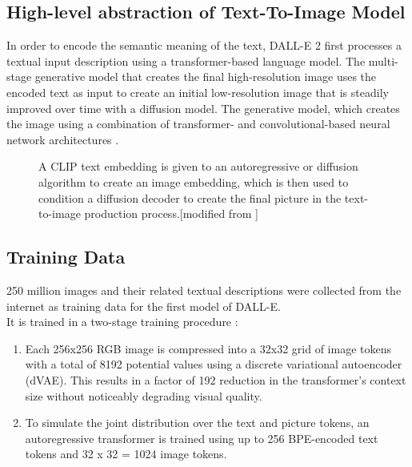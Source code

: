 \documentclass[9pt,twocolumn,twoside]{osajnl}
\begin{document}
\subsection{High-level abstraction of Text-To-Image Model}
In order to encode the semantic meaning of the text, DALL-E 2 first processes a textual input description using a transformer-based language model. The multi-stage generative model that creates the final high-resolution image uses the encoded text as input to create an initial low-resolution image that is steadily improved over time with a diffusion model. The generative model, which creates the image using a combination of transformer- and convolutional-based neural network architectures \cite{T2IReview}.

\begin{figure} [h]
	\centering
	\caption{A CLIP text embedding is given to an autoregressive or diffusion algorithm to create an image embedding, which is then used to condition a diffusion decoder to create the final picture in the text-to-image production process.[modified from \cite{CLIP}]}
\end{figure}

\subsection{Training Data}
250 million images and their related textual descriptions were collected from the internet as training data for the first model of DALL-E.\\
It is trained in a two-stage training procedure \cite{zeroShot}:
\begin{enumerate}
	\item Each 256x256 RGB image is compressed into a 32x32 grid of image tokens with a total of 8192 potential values using a discrete variational autoencoder (dVAE). This results in a factor of 192 reduction in the transformer's context size without noticeably degrading visual quality.
	\item To simulate the joint distribution over the text and picture tokens, an autoregressive transformer is trained using up to 256 BPE-encoded text tokens and 32 x 32 = 1024 image tokens.
\end{enumerate}
\end{document}
